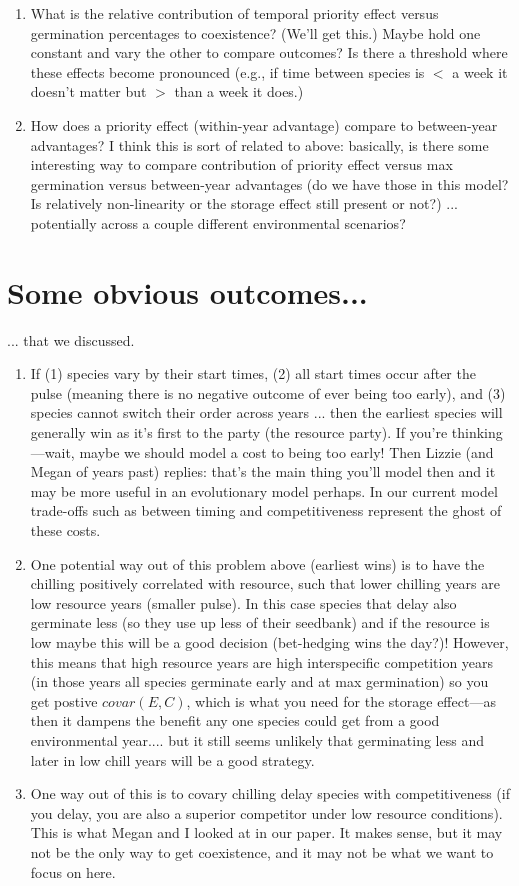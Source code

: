 \documentclass[11pt,letter]{article}
\begin{document}
\begin{enumerate}
\item What is the relative contribution of temporal priority effect versus germination percentages to coexistence? (We'll get this.) Maybe hold one constant and vary the other to compare outcomes? Is there a threshold where these effects become pronounced (e.g., if time between species is $<$ a week it doesn't matter but $>$ than a week it does.)
\item How does a priority effect (within-year advantage) compare to between-year advantages? I think this is sort of related to above: basically, is there some interesting way to compare contribution of priority effect versus max germination versus between-year advantages (do we have those in this model? Is relatively non-linearity or the storage effect still present or not?) ... potentially across a couple different environmental scenarios?
\end{enumerate}

\section{Some obvious outcomes...}
... that we discussed.

\begin{enumerate}
\item If (1) species vary by their start times, (2) all start times occur after the pulse (meaning there is no negative outcome of ever being too early), and (3) species cannot switch their order across years ... then the earliest species will generally win as it's first to the party (the resource party). If you're thinking---wait, maybe we should model a cost to being too early! Then Lizzie (and Megan of years past) replies: that's the main thing you'll model then and it may be more useful in an evolutionary model perhaps. In our current model trade-offs such as between timing and competitiveness represent the ghost of these costs. 
\item One potential way out of this problem above (earliest wins) is to have the chilling positively correlated with resource, such that lower chilling years are low resource years (smaller pulse). In this case species that delay also germinate less (so they use up less of their seedbank) and if the resource is low maybe this will be a good decision (bet-hedging wins the day?)! However, this means that high resource years are high interspecific competition years (in those years all species germinate early and at max germination) so you get postive $covar(E,C)$, which is what you need for the storage effect---as then it dampens the benefit any one species could get from a good environmental year.... but it still seems unlikely that germinating less and later in low chill years will be a good strategy.
\item One way out of this is to covary chilling delay species with competitiveness (if you delay, you are also a superior competitor under low resource conditions). This is what Megan and I looked at in our paper. It makes sense, but it may not be the only way to get coexistence, and it may not be what we want to focus on here. 
\end{enumerate}
\end{document}
